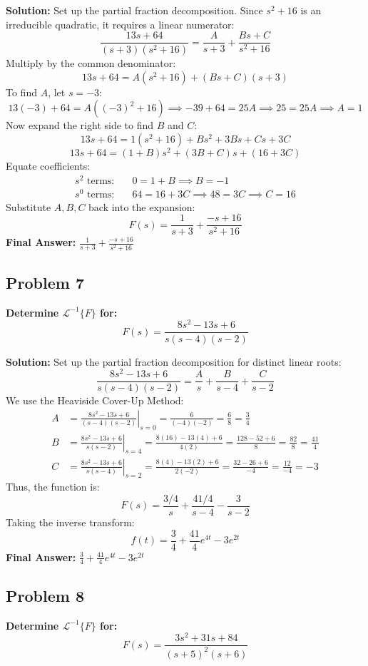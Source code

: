 \documentclass[11pt, a4paper]{article}
\theoremstyle{definition}
\theoremstyle{remark}
\newcommand{\InvLaplace}{\mathcal{L}^{-1}}
\begin{document}
\textbf{Solution:}
Set up the partial fraction decomposition. Since $s^2+16$ is an irreducible quadratic, it requires a linear numerator:
\[ \frac{13s + 64}{(s+3)(s^2+16)} = \frac{A}{s+3} + \frac{Bs+C}{s^2+16} \]
Multiply by the common denominator:
\[ 13s + 64 = A(s^2+16) + (Bs+C)(s+3) \]
To find $A$, let $s = -3$:
\[ 13(-3) + 64 = A((-3)^2 + 16) \implies -39 + 64 = 25A \implies 25 = 25A \implies A = 1 \]
Now expand the right side to find $B$ and $C$:
\[ 13s + 64 = 1(s^2+16) + Bs^2 + 3Bs + Cs + 3C \]
\[ 13s + 64 = (1+B)s^2 + (3B+C)s + (16+3C) \]
Equate coefficients:
\begin{align*}
    s^2 \text{ terms:} \quad & 0 = 1 + B \implies B = -1 \\
    s^0 \text{ terms:} \quad & 64 = 16 + 3C \implies 48 = 3C \implies C = 16
\end{align*}
Substitute $A, B, C$ back into the expansion:
\[ F(s) = \frac{1}{s+3} + \frac{-s+16}{s^2+16} \]
\textbf{Final Answer:} $\frac{1}{s+3} + \frac{-s+16}{s^2+16}$

\subsection*{Problem 7}
\textbf{Determine $\InvLaplace\{F\}$ for:}
\[ F(s) = \frac{8s^2 - 13s + 6}{s(s-4)(s-2)} \]

\textbf{Solution:}
Set up the partial fraction decomposition for distinct linear roots:
\[ \frac{8s^2 - 13s + 6}{s(s-4)(s-2)} = \frac{A}{s} + \frac{B}{s-4} + \frac{C}{s-2} \]
We use the Heaviside Cover-Up Method:
\begin{align*}
    A &= \left. \frac{8s^2 - 13s + 6}{(s-4)(s-2)} \right|_{s=0} = \frac{6}{(-4)(-2)} = \frac{6}{8} = \frac{3}{4} \\[6pt]
    B &= \left. \frac{8s^2 - 13s + 6}{s(s-2)} \right|_{s=4} = \frac{8(16) - 13(4) + 6}{4(2)} = \frac{128 - 52 + 6}{8} = \frac{82}{8} = \frac{41}{4} \\[6pt]
    C &= \left. \frac{8s^2 - 13s + 6}{s(s-4)} \right|_{s=2} = \frac{8(4) - 13(2) + 6}{2(-2)} = \frac{32 - 26 + 6}{-4} = \frac{12}{-4} = -3
\end{align*}
Thus, the function is:
\[ F(s) = \frac{3/4}{s} + \frac{41/4}{s-4} - \frac{3}{s-2} \]
Taking the inverse transform:
\[ f(t) = \frac{3}{4} + \frac{41}{4}e^{4t} - 3e^{2t} \]
\textbf{Final Answer:} $\frac{3}{4} + \frac{41}{4}e^{4t} - 3e^{2t}$

\subsection*{Problem 8}
\textbf{Determine $\InvLaplace\{F\}$ for:}
\[ F(s) = \frac{3s^2 + 31s + 84}{(s+5)^2(s+6)} \]
\end{document}
